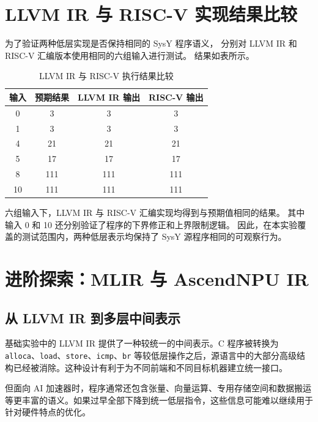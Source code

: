 \documentclass[12pt,a4paper]{ctexart}
\begin{document}
\section{LLVM IR 与 RISC-V 实现结果比较}

为了验证两种低层实现是否保持相同的 SysY 程序语义，
分别对 LLVM IR 和 RISC-V 汇编版本使用相同的六组输入进行测试。
结果如表所示。

\begin{table}[H]
\centering
\caption{LLVM IR 与 RISC-V 执行结果比较}
\begin{tabular}{cccc}
\toprule
输入 & 预期结果 & LLVM IR 输出 & RISC-V 输出 \\
\midrule
0  & 3   & 3   & 3 \\
1  & 3   & 3   & 3 \\
4  & 21  & 21  & 21 \\
5  & 17  & 17  & 17 \\
8  & 111 & 111 & 111 \\
10 & 111 & 111 & 111 \\
\bottomrule
\end{tabular}
\end{table}

六组输入下，LLVM IR 与 RISC-V 汇编实现均得到与预期值相同的结果。
其中输入 0 和 10 还分别验证了程序的下界修正和上界限制逻辑。
因此，在本实验覆盖的测试范围内，两种低层表示均保持了
SysY 源程序相同的可观察行为。

\section{进阶探索：MLIR 与 AscendNPU IR}

\subsection{从 LLVM IR 到多层中间表示}

基础实验中的 LLVM IR 提供了一种较统一的中间表示。C 程序被转换为 \texttt{alloca}、\texttt{load}、\texttt{store}、\texttt{icmp}、\texttt{br} 等较低层操作之后，源语言中的大部分高级结构已经被消除。这种设计有利于为不同前端和不同目标机器建立统一接口。

但面向 AI 加速器时，程序通常还包含张量、向量运算、专用存储空间和数据搬运等更丰富的语义。如果过早全部下降到统一低层指令，这些信息可能难以继续用于针对硬件特点的优化。
\end{document}
